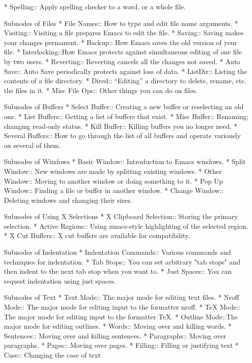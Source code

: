 * Spelling::    Apply spelling checker to a word, or a whole file.

Subnodes of Files
* File Names::  How to type and edit file name arguments.
* Visiting::    Visiting a file prepares Emacs to edit the file.
* Saving::      Saving makes your changes permanent.
* Backup::      How Emacs saves the old version of your file.
* Interlocking::How Emacs protects against simultaneous editing
                 of one file by two users.
* Reverting::   Reverting cancels all the changes not saved.
* Auto Save::   Auto Save periodically protects against loss of data.
* ListDir::     Listing the contents of a file directory.
* Dired::       ``Editing'' a directory to delete, rename, etc.
                 the files in it.
* Misc File Ops:: Other things you can do on files.

Subnodes of Buffers
* Select Buffer::   Creating a new buffer or reselecting an old one.
* List Buffers::    Getting a list of buffers that exist.
* Misc Buffer::     Renaming; changing read-only status.
* Kill Buffer::     Killing buffers you no longer need.
* Several Buffers:: How to go through the list of all buffers
                     and operate variously on several of them.

Subnodes of Windows
* Basic Window::    Introduction to Emacs windows.
* Split Window::    New windows are made by splitting existing windows.
* Other Window::    Moving to another window or doing something to it.
* Pop Up Window::   Finding a file or buffer in another window.
* Change Window::   Deleting windows and changing their sizes.

Subnodes of Using X Selections
* X Clipboard Selection::     Storing the primary selection.
* Active Regions::  Using zmacs-style highlighting of the selected region.
* X Cut Buffers::   X cut buffers are available for compatibility.

Subnodes of Indentation
* Indentation Commands:: Various commands and techniques for indentation.
* Tab Stops::   You can set arbitrary "tab stops" and then
                 indent to the next tab stop when you want to.
* Just Spaces:: You can request indentation using just spaces.

Subnodes of Text
* Text Mode::   The major mode for editing text files.
* Nroff Mode::  The major mode for editing input to the formatter nroff.
* TeX Mode::    The major mode for editing input to the formatter TeX.
* Outline Mode::The major mode for editing outlines.
* Words::       Moving over and killing words.
* Sentences::   Moving over and killing sentences.
* Paragraphs::	Moving over paragraphs.
* Pages::	Moving over pages.
* Filling::     Filling or justifying text
* Case::        Changing the case of text

